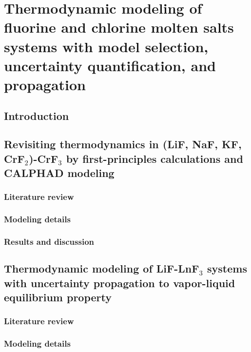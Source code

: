\chapter{Thermodynamic modeling of fluorine and chlorine molten salts systems with model selection, uncertainty quantification, and propagation} \label{chap:moltensalts}

\section{Introduction} \label{moltensalts:sec:intro}

\section{Revisiting thermodynamics in (LiF, NaF, KF, CrF${_2}$)-CrF${_3}$ by first-principles calculations and CALPHAD modeling } \label{moltensalts:sec:FLiNaKCr}


\subsection{Literature review} \label{moltensalts:ssec:FLiNaKCrlit}


\subsection{Modeling details} \label{moltensalts:ssec:FLiNaKCrmodel}


\subsection{Results and discussion} \label{moltensalts:ssec:FLiNaKCrresult}


\section{Thermodynamic modeling of LiF-LnF${_3}$ systems with uncertainty propagation to vapor-liquid equilibrium property} \label{moltensalts:sec:LiFLnF3}

\subsection{Literature review} \label{moltensalts:ssec:LiFLnF3lit}


\subsection{Modeling details} \label{moltensalts:ssec:LiFLnF3model}


